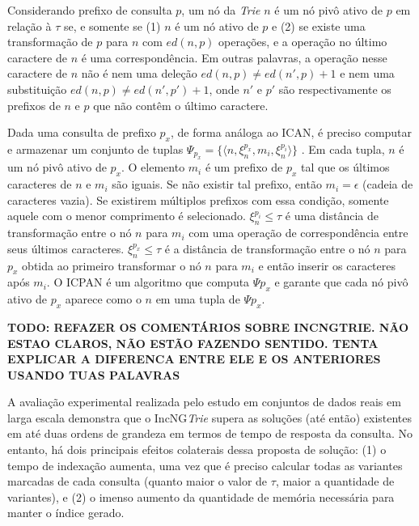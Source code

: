 Considerando prefixo de consulta $p$, um nó da \textit{Trie} $n$ é um nó pivô ativo de $p$ em relação à $\tau$ se, e somente se (1) $n$ é um nó ativo de $p$ e (2) se existe uma transformação de $p$ para $n$ com $ed(n,p)$ operações, e a operação no último caractere de $n$ é uma correspondência. Em outras palavras, a operação nesse caractere de $n$ não é nem uma deleção $ed(n,p) \neq ed(n',p) + 1$ e nem uma substituição $ed(n,p) \neq ed(n', p') + 1$, onde $n'$ e $p'$ são respectivamente os prefixos de $n$ e $p$ que não contêm o último caractere.

Dada uma consulta de prefixo $p_{x}$, de forma análoga ao ICAN, é preciso computar e armazenar um conjunto de tuplas $\Psi_{p_{x}} = \{ \langle n, \xi_{n}^{p_{x}}, m_{i}, \xi_{n}^{p_{i}} \rangle \}$ \citep{li2011efficient}. Em cada tupla, $n$ é um nó pivô ativo de $p_{x}$. O elemento $m_{i}$ é um prefixo de $p_{x}$ tal que os últimos caracteres de $n$ e $m_{i}$ são iguais. Se não existir tal prefixo, então $m_{i} = \epsilon$ (cadeia de caracteres vazia). Se existirem múltiplos prefixos com essa condição, somente aquele com o menor comprimento é selecionado. $\xi_{n}^{p_{i}} \leq \tau$ é uma distância de transformação entre o nó $n$ para $m_{i}$ com uma operação de correspondência entre seus últimos caracteres. $\xi_{n}^{p_{x}} \leq \tau$ é a distância de transformação entre o nó $n$ para $p_{x}$ obtida ao primeiro transformar o nó $n$ para $m_{i}$ e então inserir os caracteres após $m_{i}$. O ICPAN é um algoritmo que computa $\Psi{p_{x}}$ e garante que cada nó pivô ativo de $p_{x}$ aparece como o $n$ em uma tupla de $\Psi{p_{x}}$.

\textbf{TODO: REFAZER OS COMENTÁRIOS SOBRE INCNGTRIE. NÃO ESTAO CLAROS, NÃO ESTÃO FAZENDO SENTIDO. TENTA EXPLICAR A DIFERENCA ENTRE ELE E OS ANTERIORES USANDO TUAS PALAVRAS}


A avaliação experimental realizada pelo estudo em conjuntos de dados reais em larga escala demonstra que o IncNG\textit{Trie} supera as soluções (até então) existentes em até duas ordens de grandeza em termos de tempo de resposta da consulta. No entanto, há dois principais efeitos colaterais dessa proposta de solução: (1) o tempo de indexação aumenta, uma vez que é preciso calcular todas as variantes marcadas de cada consulta (quanto maior o valor de $\tau$, maior a quantidade de variantes), e (2) o imenso aumento da quantidade de memória necessária para manter o índice gerado. 

